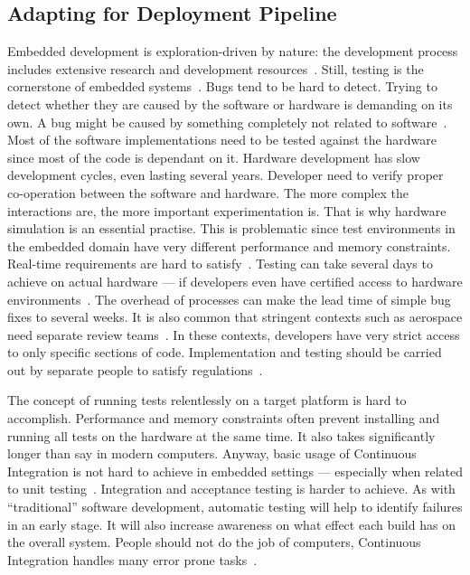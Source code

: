 \documentclass[english]{tktltiki2}
\begin{document}
\subsection{Adapting for Deployment Pipeline}

Embedded development is exploration-driven by nature: the development process includes extensive research and development resources~\cite{EHS14}. Still, testing is the cornerstone of embedded systems~\cite{RA03, HAB12, KRM13, EHS14, Ngy15}. Bugs tend to be hard to detect. Trying to detect whether they are caused by the software or hardware is demanding on its own. A bug might be caused by something completely not related to software~\cite{Ngy15}. Most of the software implementations need to be tested against the hardware since most of the code is dependant on it. Hardware development has slow development cycles, even lasting several years. Developer need to verify proper co-operation between the software and hardware. The more complex the interactions are, the more important experimentation is. That is why hardware simulation is an essential practise. This is problematic since test environments in the embedded domain have very different performance and memory constraints. Real-time requirements are hard to satisfy~\cite{RA03, HMP12}. Testing can take several days to achieve on actual hardware — if developers even have certified access to hardware environments~\cite{VB09}. The overhead of processes can make the lead time of simple bug fixes to several weeks. It is also common that stringent contexts such as aerospace need separate review teams~\cite{VB09}. In these contexts, developers have very strict access to only specific sections of code. Implementation and testing should be carried out by separate people to satisfy regulations~\cite{VB09, JLP12}.

The concept of running tests relentlessly on a target platform is hard to accomplish. Performance and memory constraints often prevent installing and running all tests on the hardware at the same time. It also takes significantly longer than say in modern computers. Anyway, basic usage of Continuous Integration is not hard to achieve in embedded settings — especially when related to unit testing~\cite{RA03, KRM13}. Integration and acceptance testing is harder to achieve. As with “traditional” software development, automatic testing will help to identify failures in an early stage. It will also increase awareness on what effect each build has on the overall system. People should not do the job of computers, Continuous Integration handles many error prone tasks~\cite{Ngy15}.
\end{document}
